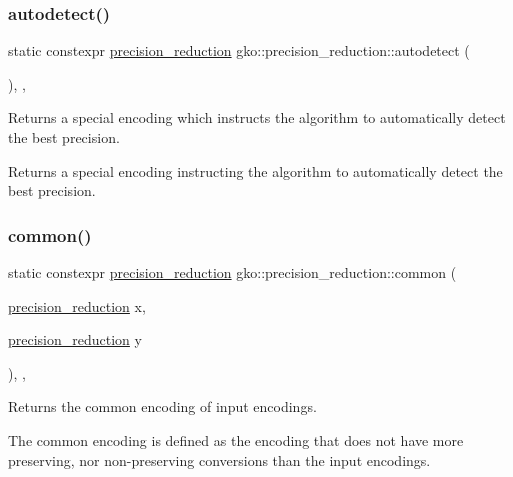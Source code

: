 \subsubsection{\texorpdfstring{autodetect()}{autodetect()}}
{\footnotesize\ttfamily static constexpr \hyperlink{classgko_1_1precision__reduction}{precision\+\_\+reduction} gko\+::precision\+\_\+reduction\+::autodetect (\begin{DoxyParamCaption}{ }\end{DoxyParamCaption})\hspace{0.3cm}{\ttfamily [inline]}, {\ttfamily [static]}, {\ttfamily [noexcept]}}



Returns a special encoding which instructs the algorithm to automatically detect the best precision. 

\begin{DoxyReturn}{Returns}
a special encoding instructing the algorithm to automatically detect the best precision. 
\end{DoxyReturn}
\mbox{\label{classgko_1_1precision__reduction_aa0ac7ac5a2807f3a0e9bd245273be388}} 
\subsubsection{\texorpdfstring{common()}{common()}}
{\footnotesize\ttfamily static constexpr \hyperlink{classgko_1_1precision__reduction}{precision\+\_\+reduction} gko\+::precision\+\_\+reduction\+::common (\begin{DoxyParamCaption}\item[{\hyperlink{classgko_1_1precision__reduction}{precision\+\_\+reduction}}]{x,  }\item[{\hyperlink{classgko_1_1precision__reduction}{precision\+\_\+reduction}}]{y }\end{DoxyParamCaption})\hspace{0.3cm}{\ttfamily [inline]}, {\ttfamily [static]}, {\ttfamily [noexcept]}}



Returns the common encoding of input encodings. 

The common encoding is defined as the encoding that does not have more preserving, nor non-\/preserving conversions than the input encodings.


